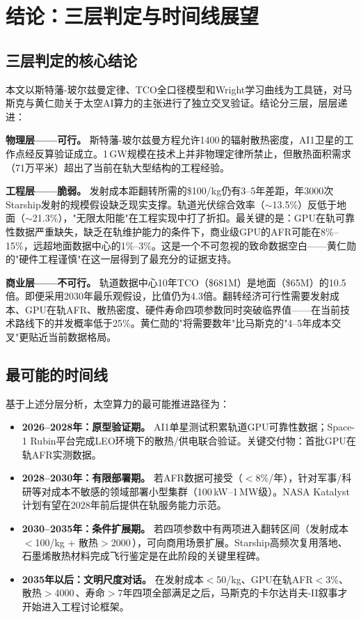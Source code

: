 
\section{结论：三层判定与时间线展望}

\subsection{三层判定的核心结论}

本文以斯特藩-玻尔兹曼定律、TCO全口径模型和Wright学习曲线为工具链，对马斯克与黄仁勋关于太空AI算力的主张进行了独立交叉验证。结论分三层，层层递进：

\textbf{物理层——可行。} 斯特藩-玻尔兹曼方程允许1400\,\unitWpm{}的辐射散热密度，AI1卫星的工作点经反算验证成立。1\,GW规模在技术上并非物理定律所禁止，但散热面积需求（71万平米）超出了当前在轨大型结构的工程经验。

\textbf{工程层——脆弱。} 发射成本距翻转所需的\$100/kg仍有3--5年差距，年3000次Starship发射的规模假设缺乏现实支撑。轨道光伏综合效率（$\sim$13.5\%）反低于地面（$\sim$21.3\%），"无限太阳能"在工程实现中打了折扣。最关键的是：GPU在轨可靠性数据严重缺失，缺乏在轨维护能力的条件下，商业级GPU的AFR可能在8\%--15\%，远超地面数据中心的1\%--3\%。这是一个不可忽视的致命数据空白——黄仁勋的"硬件工程谨慎"在这一层得到了最充分的证据支持。

\textbf{商业层——不可行。} 轨道数据中心10年TCO（\$681M）是地面（\$65M）的10.5倍。即便采用2030年最乐观假设，比值仍为4.3倍。翻转经济可行性需要发射成本、GPU在轨AFR、散热密度、硬件寿命四项参数同时突破临界值——在当前技术路线下的并发概率低于25\%。黄仁勋的"将需要数年"比马斯克的"4--5年成本交叉"更贴近当前数据格局。

\subsection{最可能的时间线}

基于上述分层分析，太空算力的最可能推进路径为：

\begin{itemize}[nosep]
    \item \textbf{2026--2028年：原型验证期。} AI1单星测试积累轨道GPU可靠性数据；Space-1 Rubin平台完成LEO环境下的散热/供电联合验证\cite{huang2026gtc}。关键交付物：首批GPU在轨AFR实测数据。
    \item \textbf{2028--2030年：有限部署期。} 若AFR数据可接受（$<$8\%/年），针对军事/科研等对成本不敏感的领域部署小型集群（100\,kW--1\,MW级）。NASA Katalyst计划有望在2028年前后提供在轨服务能力示范\cite{nasa2026katalyst}。
    \item \textbf{2030--2035年：条件扩展期。} 若四项参数中有两项进入翻转区间（发射成本$<$100/kg + 散热$>$2000\,\unitWpm{}），可向商用场景扩展。Starship高频次复用落地、石墨烯散热材料完成飞行鉴定是在此阶段的关键里程碑\cite{kanti2025graphene}。
    \item \textbf{2035年以后：文明尺度对话。} 在发射成本$<$50/kg、GPU在轨AFR$<$3\%、散热$>$4000\,\unitWpm{}、寿命$>$7年四项全部满足之后，马斯克的卡尔达肖夫-II叙事才开始进入工程讨论框架。
\end{itemize}

